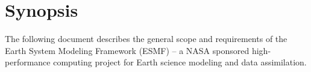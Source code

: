 \section{Synopsis}

The following document describes the general scope and requirements
of the Earth System Modeling Framework (ESMF) -- a NASA sponsored 
high-performance computing project for Earth science modeling and 
data assimilation. 







